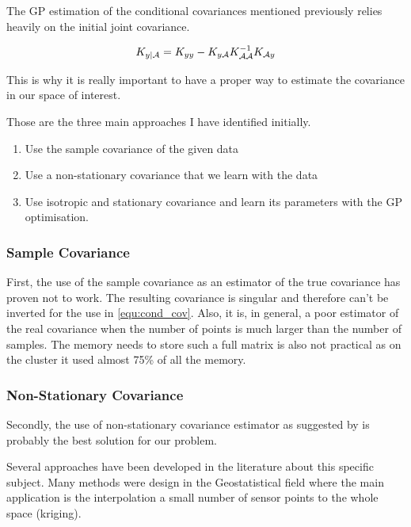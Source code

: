 The GP estimation of the conditional covariances mentioned previously relies heavily on the initial joint covariance. 

\begin{equation}
    K_{y | \mathcal{A}} = K_{yy} - K_{y\mathcal{A}} K_{\mathcal{A}\mathcal{A}}^{-1} K_{\mathcal{A} y} \label{equ:cond_cov}
\end{equation}

This is why it is really important to have a proper way to estimate the covariance in our space of interest. 

Those are the three main approaches I have identified initially. 

\begin{enumerate}
    \item Use the sample covariance of the given data
    \item Use a non-stationary covariance that we learn with the data
    \item Use isotropic and stationary covariance and learn its parameters with the GP optimisation. 
\end{enumerate}

\subsubsection{Sample Covariance}
First, the use of the sample covariance as an estimator of the true covariance has proven not to work. The resulting covariance is singular and therefore can't be inverted for the use in \ref{equ:cond_cov}. Also, it is, in general, a poor estimator of the real covariance when the number of points is much larger than the number of samples. The memory needs to store such a full matrix is also not practical as on the cluster it used almost 75\% of all the memory. \\

\subsubsection{Non-Stationary Covariance}

Secondly, the use of non-stationary covariance estimator as suggested by \citet{krause_near-optimal_2008} is probably the best solution for our problem.

Several approaches have been developed in the literature about this specific subject. Many methods were design in the Geostatistical field where the main application is the interpolation a small number of sensor points to the whole space (kriging). 

